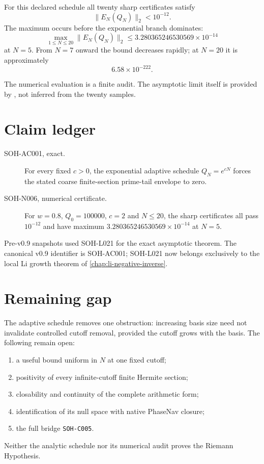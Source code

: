 For this declared schedule all twenty sharp certificates satisfy
\[
 \|E_N(Q_N)\|_2<10^{-12}.
\]
The maximum occurs before the exponential branch dominates:
\[
 \boxed{
 \max_{1\le N\le20}\|E_N(Q_N)\|_2
 \le
 3.280365246530569\times10^{-14}
 }
\]
at $N=5$. From $N=7$ onward the bound decreases rapidly; at $N=20$ it is
approximately
\[
 6.58\times10^{-222}.
\]

The numerical evaluation is a finite audit. The asymptotic limit itself is
provided by , not inferred from the twenty
samples.

\section{Claim ledger}

\begin{description}
\item[SOH-AC001, exact.] For every fixed $c>0$, the exponential adaptive
schedule $Q_N=e^{cN}$ forces the stated coarse finite-section prime-tail
envelope to zero.

\item[SOH-N006, numerical certificate.] For $w=0.8$, $Q_0=100000$, $c=2$ and
$N\le20$, the sharp certificates all pass $10^{-12}$ and have maximum
$3.280365246530569\times10^{-14}$ at $N=5$.
\end{description}

Pre-v0.9 snapshots used SOH-L021 for the exact asymptotic theorem. The canonical
v0.9 identifier is SOH-AC001; SOH-L021 now belongs exclusively to the local Li
growth theorem of \cref{chap:li-negative-inverse}.

\section{Remaining gap}

The adaptive schedule removes one obstruction: increasing basis size need not
invalidate controlled cutoff removal, provided the cutoff grows with the
basis. The following remain open:

\begin{enumerate}
\item a useful bound uniform in $N$ at one fixed cutoff;
\item positivity of every infinite-cutoff finite Hermite section;
\item closability and continuity of the complete arithmetic form;
\item identification of its null space with native PhaseNav closure;
\item the full bridge \texttt{SOH-C005}.
\end{enumerate}

Neither the analytic schedule nor its numerical audit proves the Riemann
Hypothesis.
